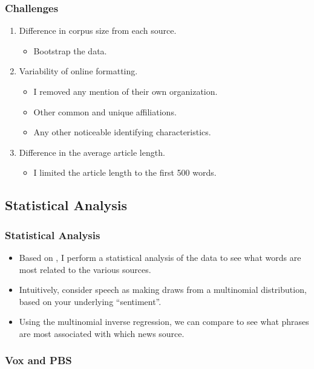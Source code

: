 \documentclass{beamer}
\begin{document}
    \begin{frame}
    	\frametitle{Challenges}
		\begin{enumerate}
			\item Difference in corpus size from each source. 
			\begin{itemize}
				\item Bootstrap the data. 
			\end{itemize}  
		
		    \item Variability of online formatting. 
		    \begin{itemize}
		    	\item I removed any mention of their own organization.
		    	\item Other common and unique affiliations. 
		    	\item Any other noticeable identifying characteristics.
		    \end{itemize}   
	    
	        \item Difference in the average article length. 
	        \begin{itemize}
	        	\item I limited the article length to the first 500 words.
	        \end{itemize}
		\end{enumerate}
    \end{frame}
    
	\subsection{Statistical Analysis}
	
	\begin{frame}
		\frametitle{Statistical Analysis}
		\begin{itemize}
			\item Based on \citet{taddy2013multinomial}, I perform a statistical analysis of the data to see what words are most related to the various sources.
			\item Intuitively, consider speech as making draws from a multinomial distribution, based on your underlying ``sentiment''. 
			\item Using the multinomial inverse regression, we can compare to see what phrases are most associated with which news source. 
		\end{itemize}
	\end{frame}

	\begin{frame}
		\frametitle{Vox and PBS}
		
	\end{frame}
\end{document}
